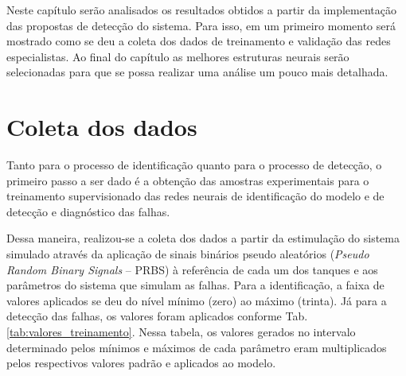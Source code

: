 \label{cap:resultados}

Neste capítulo serão analisados os resultados obtidos a partir da implementação
das propostas de detecção do sistema. Para isso, em um primeiro momento será
mostrado como se deu a coleta dos dados de treinamento e validação das redes
especialistas. Ao final do capítulo as melhores estruturas neurais serão
selecionadas para que se possa realizar uma análise um pouco mais detalhada.

\section{Coleta dos dados}
Tanto para o processo de identificação quanto para o processo de detecção, o
primeiro passo a ser dado é a obtenção das amostras experimentais para o
treinamento supervisionado das redes neurais de identificação do modelo e de
detecção e diagnóstico das falhas.

Dessa maneira, realizou-se a coleta dos dados a partir da estimulação do sistema
simulado através da aplicação de sinais binários pseudo aleatórios ({\it Pseudo
Random Binary Signals} -- PRBS) à referência de cada um dos tanques e aos
parâmetros do sistema que simulam as falhas. Para a identificação, a faixa de
valores aplicados se deu do nível mínimo (zero) ao máximo (trinta). Já para a
detecção das falhas, os valores foram aplicados conforme Tab.
\ref{tab:valores_treinamento}. Nessa tabela, os valores gerados no intervalo
determinado pelos mínimos e máximos de cada parâmetro eram multiplicados pelos
respectivos valores padrão e aplicados ao modelo.

